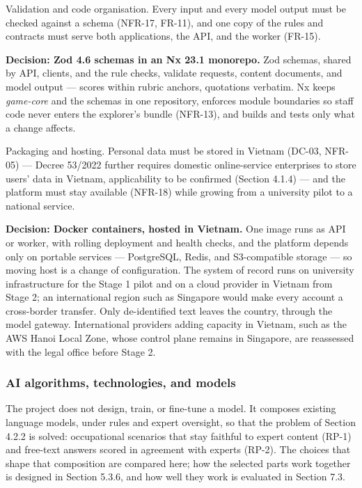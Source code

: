 Validation and code organisation. Every input and every model output must be checked against a schema (NFR-17, FR-11), and one copy of the rules and contracts must serve both applications, the API, and the worker (FR-15).

\textbf{Decision: Zod 4.6 schemas in an Nx 23.1 monorepo.} Zod schemas, shared by API, clients, and the rule checks, validate requests, content documents, and model output --- scores within rubric anchors, quotations verbatim. Nx keeps \textit{game-core} and the schemas in one repository, enforces module boundaries so staff code never enters the explorer's bundle (NFR-13), and builds and tests only what a change affects\cite{r158}.

Packaging and hosting. Personal data must be stored in Vietnam (DC-03, NFR-05) --- Decree 53/2022 further requires domestic online-\allowbreak{}service enterprises to store users' data in Vietnam, applicability to be confirmed (Section 4.1.4)\cite{r159,r160} --- and the platform must stay available (NFR-18) while growing from a university pilot to a national service.

\textbf{Decision: Docker containers, hosted in Vietnam.} One image runs as API or worker, with rolling deployment and health checks, and the platform depends only on portable services --- PostgreSQL, Redis, and S3-\allowbreak{}compatible storage --- so moving host is a change of configuration. The system of record runs on university infrastructure for the Stage 1 pilot and on a cloud provider in Vietnam from Stage 2\cite{r161}; an international region such as Singapore would make every account a cross-\allowbreak{}border transfer\cite{r99}. Only de-\allowbreak{}identified text leaves the country, through the model gateway. International providers adding capacity in Vietnam, such as the AWS Hanoi Local Zone, whose control plane remains in Singapore\cite{r162}, are reassessed with the legal office before Stage 2.

\subsubsection{AI algorithms, technologies, and models}

The project does not design, train, or fine-tune a model. It composes existing language models, under rules and expert oversight, so that the problem of Section 4.2.2 is solved: occupational scenarios that stay faithful to expert content (RP-1) and free-text answers scored in agreement with experts (RP-2). The choices that shape that composition are compared here; how the selected parts work together is designed in Section 5.3.6, and how well they work is evaluated in Section 7.3.

